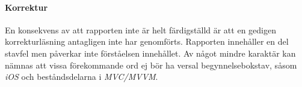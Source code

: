     \paragraph{Korrektur}
        En konsekvens av att rapporten inte är helt färdigställd är att en gedigen korrekturläsning antagligen inte har genomförts. Rapporten innehåller en del stavfel men påverkar inte förståelsen innehållet. Av något mindre karaktär kan nämnas att vissa förekommande ord ej bör ha versal begynnelsebokstav, såsom \emph{iOS} och beståndsdelarna i \emph{MVC/MVVM}.


